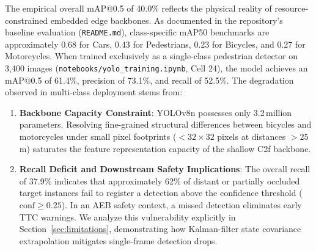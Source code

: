 \documentclass[3p,twocolumn]{elsarticle}
\begin{document}
\begin{table}[!t]
\caption{Verified YOLOv8n Multi-Class Detection Performance on BDD100K Validation Split (Epoch 30 Final)}
\label{tab:verified_detection}
\centering
\small
{}%
\end{table}

The empirical overall mAP@0.5 of 40.0\% reflects the physical reality of resource-constrained embedded edge backbones. As documented in the repository's baseline evaluation (\texttt{README.md}), class-specific mAP50 benchmarks are approximately 0.68 for Cars, 0.43 for Pedestrians, 0.23 for Bicycles, and 0.27 for Motorcycles. When trained exclusively as a single-class pedestrian detector on 3,400 images (\texttt{notebooks/yolo\_training.ipynb}, Cell 24), the model achieves an mAP@0.5 of 61.4\%, precision of 73.1\%, and recall of 52.5\%. The degradation observed in multi-class deployment stems from:
\begin{enumerate}
  \item \textbf{Backbone Capacity Constraint}: YOLOv8n possesses only 3.2\,million parameters. Resolving fine-grained structural differences between bicycles and motorcycles under small pixel footprints ($< 32\times32$ pixels at distances $> 25$\,m) saturates the feature representation capacity of the shallow C2f backbone.
  \item \textbf{Recall Deficit and Downstream Safety Implications}: The overall recall of 37.9\% indicates that approximately 62\% of distant or partially occluded target instances fail to register a detection above the confidence threshold ($\text{conf} \ge 0.25$). In an AEB safety context, a missed detection eliminates early TTC warnings. We analyze this vulnerability explicitly in Section~\ref{sec:limitations}, demonstrating how Kalman-filter state covariance extrapolation mitigates single-frame detection drops.
\end{enumerate}
\end{document}
